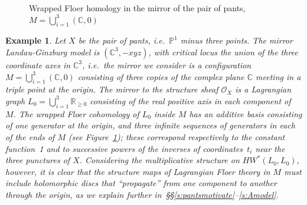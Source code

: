 \documentclass[11pt,leqno]{amsart}
\newtheorem{example}[theo]{Example}
\numberwithin{equation}{section}
\def\R{\mathbb{R}}
\def\C{\mathbb{C}}
\def\O{{\mathcal O}}
\def\PP{{\mathbb P}}
\begin{document}
\begin{figure}[t]
\caption{Wrapped Floer homology in the mirror of the pair of pants,
$M=\bigcup_{i=1}^3 (\C,0)$}\label{fig:pantsmirror}
\end{figure}

\begin{example} \label{ex:pants}
Let $X$ be the pair of pants, i.e.\ $\PP^1$ minus three points. The 
mirror Landau-Ginzburg model is $(\C^3,-xyz)$, with critical locus the
union of the three coordinate axes in $\C^3$, i.e.\ the mirror we
consider is a configuration $M=\bigcup_{i=1}^3 (\C,0)$ consisting of three copies of the complex plane $\C$ meeting in 
a triple point at the origin. The mirror to the structure sheaf $\O_X$
is a Lagrangian graph $L_0=\bigcup_{i=1}^3 \R_{\geq 0}$ consisting of the real positive
axis in each component of~$M$. The wrapped Floer cohomology of $L_0$ inside
$M$ has an additive basis consisting of one generator at the origin, and
three infinite sequences of generators in each of the ends of $M$ (see
Figure~\ref{fig:pantsmirror}); these
correspond respectively to the constant function~1 and to successive
powers of the inverses of coordinates~$t_i$ near the three punctures of $X$.
Considering the multiplicative structure on $HW^*(L_0,L_0)$, however, it is 
clear that the structure maps of Lagrangian Floer theory in $M$ must 
include holomorphic discs that ``propagate'' from one component to another
through the origin, as we explain further 
\hbox{in \S\S \ref{s:pantsmotivate}--\ref{s:Amodel}}.
\end{example}
\end{document}
